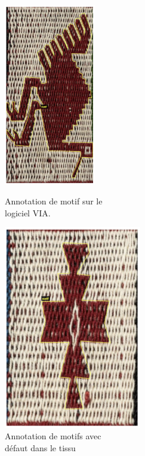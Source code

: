 \documentclass[a4paper, twoside, 12pt]{book}
\begin{document}
\begin{figure}[!h]
    \begin{minipage}[c]{.5\linewidth}
            \begin{center}
                \includegraphics[width=4cm]{images/imageVIA.png}
                \caption[Annotation de motif]{Annotation de motif sur le \\logiciel VIA.}
                \label{VIA}
            \end{center}
    \end{minipage}
    \begin{minipage}[c]{.5\linewidth}
        \begin{center}
            \includegraphics[width=6cm]{images/defautAnnotation.png}
            \caption{Annotation de motifs avec \\ défaut dans le tissu}
            \label{VIAdefaut}
        \end{center}
    \end{minipage}
\end{figure}
\end{document}
